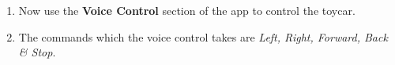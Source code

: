 \documentclass[conference]{IEEEtran}
\begin{document}
\begin{enumerate}[label=\thesection.\arabic*
,ref=\thesection.\theenumi]
\begin{figure}[!ht]
\centering
{}%
\caption{Arduino Bueetoth Controller Interface}
\label{fig:ABC_home}
\end{figure}

\item Now use the \textbf{Voice Control} section of the app to control the toycar.

\item The commands which the voice control takes are \textit{Left, Right, Forward, Back \& Stop}.

\end{enumerate}
\end{document}
